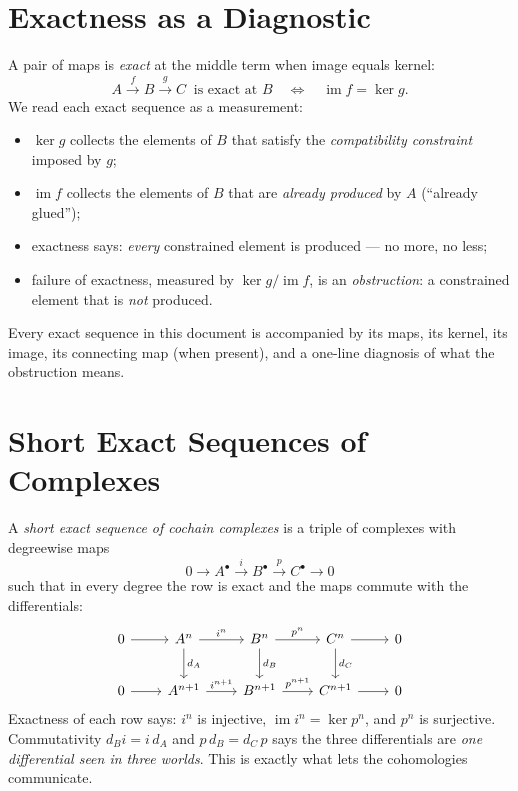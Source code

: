 \documentclass[11pt]{article}
\newcommand{\im}{\operatorname{im}}
\newcommand{\kerop}{\operatorname{ker}}
\theoremstyle{plain}
\theoremstyle{definition}
\begin{document}
\section{Exactness as a Diagnostic}
A pair of maps is \emph{exact} at the middle term when image equals kernel:
\[
  A\xrightarrow{f}B\xrightarrow{g}C \ \text{ is exact at }B
  \quad\Longleftrightarrow\quad \im f=\kerop g .
\]
We read each exact sequence as a measurement:
\begin{itemize}
  \item $\kerop g$ collects the elements of $B$ that satisfy the
        \emph{compatibility constraint} imposed by $g$;
  \item $\im f$ collects the elements of $B$ that are \emph{already produced} by
        $A$ (``already glued'');
  \item exactness says: \emph{every} constrained element is produced --- no more,
        no less;
  \item failure of exactness, measured by $\kerop g/\im f$, is an
        \emph{obstruction}: a constrained element that is \emph{not} produced.
\end{itemize}
Every exact sequence in this document is accompanied by its maps, its kernel, its
image, its connecting map (when present), and a one-line diagnosis of what the
obstruction means.

\section{Short Exact Sequences of Complexes}
A \emph{short exact sequence of cochain complexes} is a triple of complexes with
degreewise maps
\[
  0\longrightarrow A^\bullet\xrightarrow{\,i\,}B^\bullet\xrightarrow{\,p\,}C^\bullet\longrightarrow 0
\]
such that in every degree the row is exact and the maps commute with the
differentials:
\[
\begin{tikzcd}[row sep=2.2em, column sep=2.2em]
0 \arrow[r] & A^n \arrow[r,"i^n"] \arrow[d,"d_A"]
& B^n \arrow[r,"p^n"] \arrow[d,"d_B"]
& C^n \arrow[r] \arrow[d,"d_C"]
& 0 \\
0 \arrow[r] & A^{n+1} \arrow[r,"i^{n+1}"]
& B^{n+1} \arrow[r,"p^{n+1}"]
& C^{n+1} \arrow[r]
& 0
\end{tikzcd}
\]
Exactness of each row says: $i^n$ is injective, $\im i^n=\kerop p^n$, and $p^n$
is surjective. Commutativity $d_B i=i\,d_A$ and $p\,d_B=d_C\,p$ says the three
differentials are \emph{one differential seen in three worlds}. This is exactly
what lets the cohomologies communicate.
\end{document}
